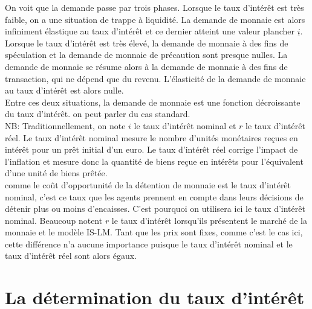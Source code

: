 \documentclass[10pt]{book}
\begin{document}
On voit que la demande passe par trois phases. Lorsque le taux d'intérêt est très faible, on a une situation de trappe à liquidité. La demande de monnaie est alors infiniment élastique au taux d'intérêt et ce dernier atteint une valeur plancher $\underline{i}$. \\
Lorsque le taux d'intérêt est très élevé, la demande de monnaie à des fins de spéculation et la demande de monnaie de précaution sont presque nulles. La demande de monnaie se résume alors à la demande de monnaie à des fins de transaction, qui ne dépend que du revenu. L'élasticité de la demande de monnaie au taux d'intérêt est alors nulle. \\
Entre ces deux situations, la demande de monnaie est une fonction décroissante du taux d'intérêt. on peut parler du cas standard. \\
NB: Traditionnellement, on note $i$ le taux d'intérêt nominal et $r$ le taux d'intérêt réel. Le taux d'intérêt nominal mesure le nombre d'unités monétaires reçues en intérêt pour un prêt initial d'un euro. Le taux d'intérêt réel corrige l'impact de l'inflation et mesure donc la quantité de biens reçue en intérêts pour l'équivalent d'une unité de biens prêtée. \\
comme le coût d'opportunité de la détention de monnaie est le taux d'intérêt nominal, c'est ce taux que les agents prennent en compte dans leurs décisions de détenir plus ou moins d'encaisses. C'est pourquoi on utilisera ici le taux d'intérêt nominal. Beaucoup notent $r$ le taux d'intérêt lorsqu'ils présentent le marché de la monnaie et le modèle IS-LM. Tant que les prix sont fixes, comme c'est le cas ici, cette différence n'a aucune importance puisque le taux d'intérêt nominal et le taux d'intérêt réel sont alors égaux.
\section{La détermination du taux d'intérêt}
\end{document}
